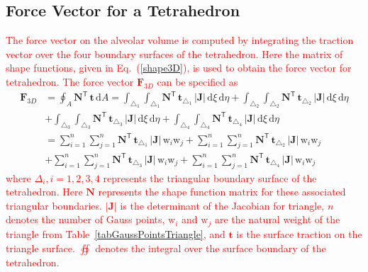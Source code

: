\subsection{Force Vector for a Tetrahedron}

\textcolor{red}{The force vector on the alveolar volume is computed by integrating the traction vector over the four boundary surfaces of the tetrahedron. Here the matrix of shape functions, given in Eq.~(\ref{shape3D}), is used to obtain the force vector for tetrahedron. The force vector $\mathbf{F}_{3D}$ can be specified as}
\begin{equation}
\begin{aligned}
\mathbf{F}_{3D} &= \oint_{A} \mathbf{N}^{\mathsf{T}} \, \mathbf{t} \, \mathrm{d} A = \int_{\triangle_{1}} \int_{\triangle_{1}} \mathbf{N}^{\mathsf{T}} \, \mathbf{t}_{\triangle_{1}} \,|\mathbf{J}| \, \mathrm{d} \xi \, \mathrm{d} \eta  + \int_{\triangle_{2}} \int_{\triangle_{2}} \mathbf{N}^{\mathsf{T}} \, \mathbf{t}_{\triangle_{2}} \,|\mathbf{J}| \, \mathrm{d} \xi \, \mathrm{d} \eta \\
& + \int_{\triangle_{3}} \int_{\triangle_{3}} \mathbf{N}^{\mathsf{T}} \, \mathbf{t}_{\triangle_{3}} \,|\mathbf{J}| \, \mathrm{d} \xi \, \mathrm{d} \eta + \int_{\triangle_{4}} \int_{\triangle_{4}} \mathbf{N}^{\mathsf{T}} \, \mathbf{t}_{\triangle_{4}} \,|\mathbf{J}| \, \mathrm{d} \xi \, \mathrm{d} \eta \\
& = \sum_{i=1}^{n} \sum_{j=1}^{n} \mathbf{N}^{\mathsf{T}} \, \mathbf{t}_{\triangle_{1}} \,|\mathbf{J}| \, \mathrm{w}_i \mathrm{w}_j + \sum_{i=1}^{n} \sum_{j=1}^{n} \mathbf{N}^{\mathsf{T}} \, \mathbf{t}_{\triangle_{2}} \,|\mathbf{J}| \, \mathrm{w}_i \mathrm{w}_j \\
& + \sum_{i=1}^{n} \sum_{j=1}^{n} \mathbf{N}^{\mathsf{T}} \, \mathbf{t}_{\triangle_{3}} \,|\mathbf{J}| \, \mathrm{w}_i \mathrm{w}_j + \sum_{i=1}^{n} \sum_{j=1}^{n} \mathbf{N}^{\mathsf{T}} \, \mathbf{t}_{\triangle_{4}} \,|\mathbf{J}| \, \mathrm{w}_i \mathrm{w}_j
\end{aligned}
\end{equation}
\textcolor{red}{where $\Delta_i, i=1, 2, 3, 4$ represents the triangular boundary surface of the tetrahedron. Here $ \mathbf{N}$ represents the shape function matrix for these associated triangular boundaries.   $|\mathbf{J}|$ is the determinant of the Jacobian for triangle, $n$ denotes the number of Gauss points, $\mathrm{w}_i$ and $\mathrm{w}_j$ are the natural weight of the triangle from Table~\ref{tabGaussPointsTriangle}, and $\mathbf{t}$ is the surface traction on the triangle surface. $\oiint$ denotes the integral over the surface boundary of the tetrahedron.} 

